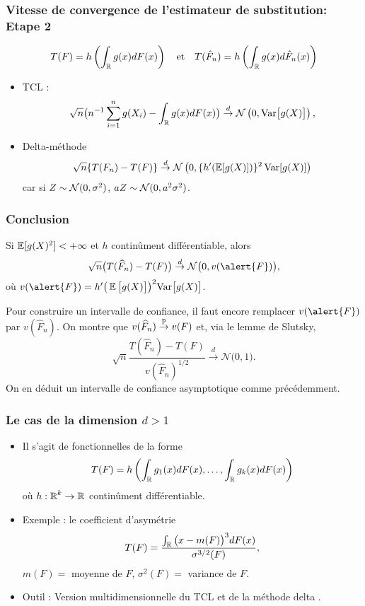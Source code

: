 \begin{frame}
\frametitle{Vitesse de convergence de l'estimateur de substitution: Etape 2}
\[
T(F)= h \left( \int_{\mathbb{R}} g(x) dF(x) \right) \quad \text{et} \quad T(\hat{F}_n)= h \left( \int_{\mathbb{R}} g(x) d \hat{F}_n(x) \right)
\]
\begin{itemize}
\item \alert{TCL} :
$$\sqrt{n}\big(n^{-1}\sum_{i=1}^ng(X_i)-\int_{\operatorname{{\mathbb R}}}g(x)dF(x)\big) \stackrel{d}{\rightarrow} \mathcal{N}\left(0,\mathrm{Var}\big[g(X)\big]\right),$$
\item \alert{Delta-méthode}
\[
\sqrt{n} \{ T(F_n) - T(F) \} \stackrel{d}{\rightarrow} \mathcal{N}\left(0, \{ h'(\operatorname{{\mathbb E}}[g(X)]) \}^2 \operatorname{\mathrm{Var}}[ g(X) ] \right)
\]
car si $Z \sim \mathcal{N}(0,\sigma^2)$, $a Z \sim \mathcal{N}(0, a^2 \sigma^2)$.
\end{itemize}
\end{frame}


\begin{frame}
\frametitle{Conclusion}
\begin{prop}
Si $\operatorname{{\mathbb E}}[g(X)^2]<+\infty$ et $h$ continûment différentiable, alors
$$\sqrt{n}\big(T(\widehat F_n)-T(F)\big)\stackrel{d}{\rightarrow} \gauss\big(0,v(\alert{F})\big),
$$
où $v(\alert{F}) = h'\big(\E\big[g(X)\big]\big)^2\mathrm{Var}\big[g(X)\big]$.
\end{prop}
Pour construire un \alert{intervalle de confiance}, il faut encore remplacer $v(\alert{F})$ par $v(\widehat F_n)$.
\alert{On montre que} $v(\widehat F_n)\stackrel{\operatorname{{\mathbb P}}}{\rightarrow} v(F)$ et, via le lemme de Slutsky,
$$
\sqrt{n}\frac{T(\widehat F_n)-T(F)}{v(\widehat F_n)^{1/2}}\stackrel{d}{\rightarrow} {\mathcal N}\big(0,1\big).
$$
On \alert{en déduit} un intervalle de confiance asymptotique comme précédemment.
\end{frame}
\begin{frame}
\frametitle{Le cas de la dimension $d>1$}
\begin{itemize}
\item Il s'agit de fonctionnelles de la forme
$$T(F) = h\left(\int_{\operatorname{{\mathbb R}}}g_1(x)dF(x),\ldots, \int_{\operatorname{{\mathbb R}}}g_k(x)dF(x)\right)$$
où $h:\operatorname{{\mathbb R}}^k\rightarrow \operatorname{{\mathbb R}}$ continûment différentiable.
\item \alert{Exemple} : le coefficient d'asymétrie
$$T(F) = \frac{\int_{\operatorname{{\mathbb R}}}\big(x-m(F)\big)^3dF(x)}{\sigma^{3/2}(F)},$$
$m(F)=$ moyenne de $F$, $\sigma^2(F) =$ variance de $F$.
\item \alert{Outil :} Version multidimensionnelle du TCL et de la \og méthode delta \fg{}.
\end{itemize}
\end{frame}

